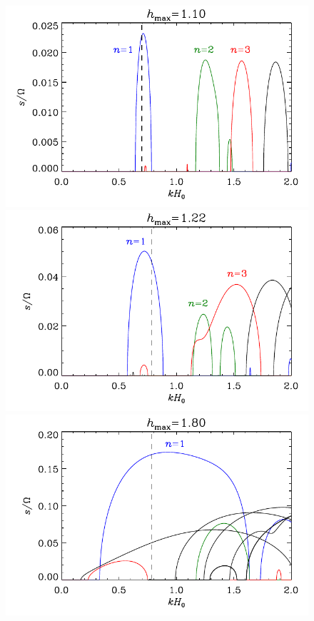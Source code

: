 \documentclass[fleqn,usenatbib]{mnras}
\begin{document}
\begin{figure}
\centering
\includegraphics[scale=0.49]{Figures/results_floquet_hmax1p1.pdf}
\includegraphics[scale=0.49]{Figures/results_floquet_hmax1p22.pdf}
\includegraphics[scale=0.49]{Figures/results_floquet_hmax1p80.pdf}

\end{figure}
\end{document}
